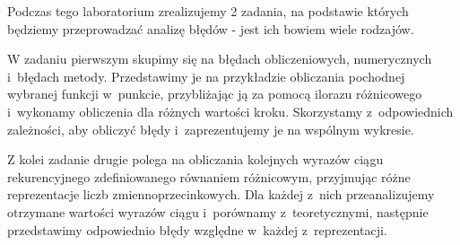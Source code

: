 \quad Podczas tego laboratorium zrealizujemy 2 zadania, na podstawie których będziemy przeprowadzać analizę błędów - jest ich bowiem wiele rodzajów. 

W zadaniu pierwszym skupimy się na błędach obliczeniowych, numerycznych i~błędach metody. Przedstawimy je na przykładzie obliczania pochodnej wybranej funkcji w~punkcie, przybliżając ją za pomocą ilorazu różnicowego i~wykonamy obliczenia dla różnych wartości kroku. Skorzystamy z~odpowiednich zależności, aby obliczyć błędy i~zaprezentujemy je na wspólnym wykresie. 

Z kolei zadanie drugie polega na obliczania kolejnych wyrazów ciągu rekurencyjnego zdefiniowanego równaniem różnicowym, przyjmując różne reprezentacje liczb zmiennoprzecinkowych. Dla każdej z~nich przeanalizujemy otrzymane wartości wyrazów ciągu i~porównamy z~teoretycznymi, następnie przedstawimy odpowiednio błędy względne w~każdej z~reprezentacji.
